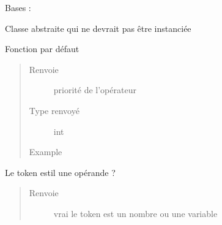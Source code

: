 \documentclass[letterpaper,10pt,french]{sphinxmanual}
\begin{document}
\begin{fulllineitems}
\label{\detokenize{parsertokens:parsertokens.Token}}
Bases : 

Classe abstraite qui ne devrait pas être instanciée

\begin{fulllineitems}
\label{\detokenize{parsertokens:parsertokens.Token.getPriority}}
Fonction par défaut
\begin{quote}\begin{description}
\item[{Renvoie}] \leavevmode
priorité de l’opérateur

\item[{Type renvoyé}] \leavevmode
int

\item[{Example}] \leavevmode
\begin{sphinxVerbatim}[commandchars=\\\{\}]
\end{sphinxVerbatim}

\end{description}\end{quote}

\end{fulllineitems}


\begin{fulllineitems}
\label{\detokenize{parsertokens:parsertokens.Token.isOperand}}
Le token est\sphinxhyphen{}il une opérande ?
\begin{quote}\begin{description}
\item[{Renvoie}] \leavevmode
vrai le token est un nombre ou une variable


\end{description}
\end{quote}
\end{fulllineitems}
\end{fulllineitems}
\end{document}
